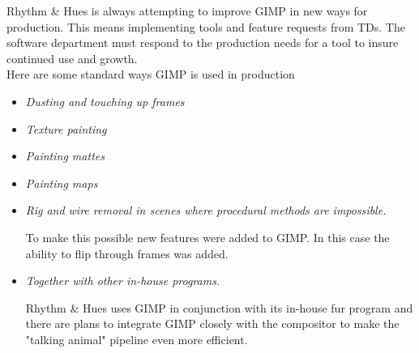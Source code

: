Rhythm \& Hues is always attempting to improve GIMP in new ways for production.
This means implementing tools and feature requests from TDs. The software
department must respond to the production needs for a tool to insure continued
use and growth.\\

Here are some standard ways GIMP is used in production 
\begin{itemize}
\item {\em Dusting and touching up frames }
\item {\em Texture painting  }
\item {\em Painting mattes }
\item {\em Painting maps }
\item {\em Rig and wire removal in scenes where procedural methods are impossible. } 

To make this possible new features were added to GIMP. In this case the ability
to flip through frames was added. 
\item {\em Together with other in-house programs. } 

Rhythm \& Hues uses GIMP in conjunction with its in-house fur program and there
are plans to integrate GIMP closely with the compositor to make the "talking
animal" pipeline even more efficient.
\end{itemize}


